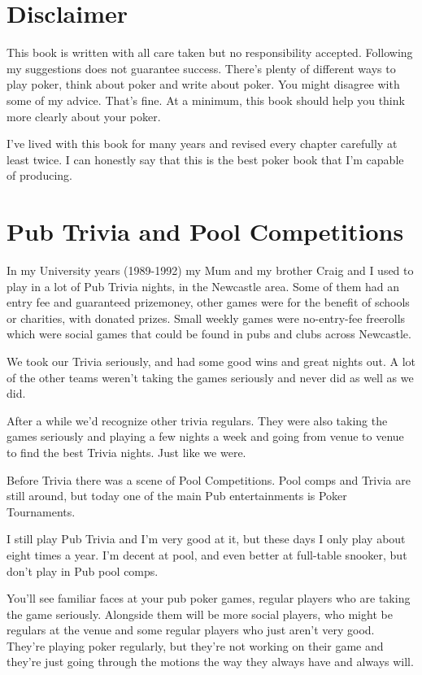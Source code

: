 \section*{Disclaimer}

This book is written with all care taken but no responsibility accepted.
Following my suggestions does not guarantee success.
There's plenty of different ways to play poker, think about poker
and write about poker. You might disagree with some of my advice.
That's fine. At a minimum, this book should help you think
more clearly about your poker.

I've lived with this book for many years and revised every chapter
carefully at least twice. I can honestly say that this is the best
poker book that I'm capable of producing.

\section{Pub Trivia and Pool Competitions}

In my University years (1989-1992) my Mum and my brother Craig and I
used to play in a lot of Pub Trivia nights, in the Newcastle
area. Some of them had an entry fee and guaranteed prizemoney, other
games were for the benefit of schools or charities, with donated
prizes. Small weekly games were no-entry-fee freerolls which were
social games that could be found in pubs and clubs across Newcastle.

We took our Trivia seriously, and had some good wins and
great nights out. A lot of the other teams weren't taking the games
seriously and never did as well as we did.

After a while we'd recognize other trivia regulars. They were also
taking the games seriously and playing a few nights a week and going
from venue to venue to find the best Trivia nights. Just like we
were.

Before Trivia there was a scene of Pool Competitions. Pool
comps and Trivia are still around, but today one of the main Pub
entertainments is Poker Tournaments.

I still play Pub Trivia and I'm very good at it, but these days
I only play about eight times a year. I'm decent at pool, and even
better at full-table snooker, but don't play in Pub pool comps.

You'll see familiar faces at your pub poker games,
regular players who are taking the game seriously. Alongside them
will be more social players, who might be regulars at the venue
and some regular players who just aren't very good. They're playing
poker regularly, but they're not working on their game and they're
just going through the motions the way they always have and always
will.

